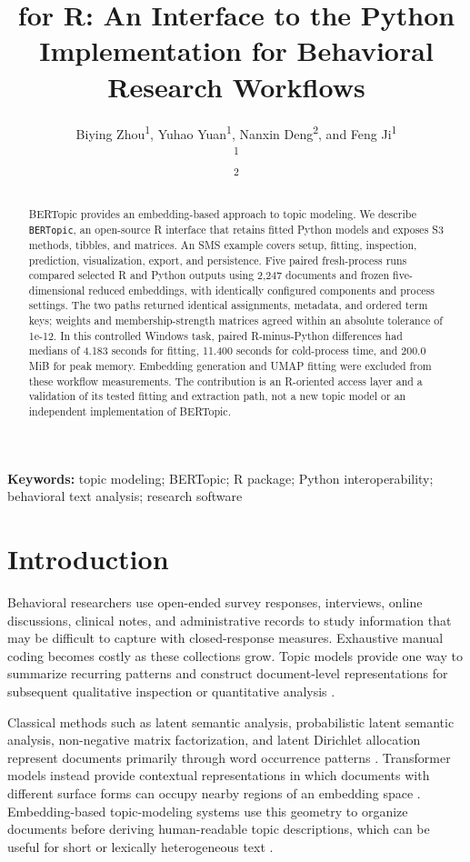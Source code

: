 \documentclass[12pt]{article}
\title{\pkg{BERTopic} for R: An Interface to the Python Implementation for Behavioral Research Workflows}
\author{
Biying Zhou\textsuperscript{1},
Yuhao Yuan\textsuperscript{1},
Nanxin Deng\textsuperscript{2},
and Feng Ji\textsuperscript{1}\\[0.5em]
\textsuperscript{1}\todo{Affiliation}\\
\textsuperscript{2}\todo{Affiliation}\\[0.5em]
\parbox{0.82\textwidth}{\centering
\todo{Corresponding author name, postal address, telephone number, and email}}
}
\date{}
\newcommand{\pkg}[1]{\texttt{#1}}
\begin{document}
\maketitle
\thispagestyle{fancy}

\begin{abstract}
BERTopic provides an embedding-based approach to topic modeling. We describe \pkg{BERTopic}, an open-source R interface that retains fitted Python models and exposes S3 methods, tibbles, and matrices. An SMS example covers setup, fitting, inspection, prediction, visualization, export, and persistence. Five paired fresh-process runs compared selected R and Python outputs using 2,247 documents and frozen five-dimensional reduced embeddings, with identically configured components and process settings. The two paths returned identical assignments, metadata, and ordered term keys; weights and membership-strength matrices agreed within an absolute tolerance of 1e-12. In this controlled Windows task, paired R-minus-Python differences had medians of 4.183 seconds for fitting, 11.400 seconds for cold-process time, and 200.0 MiB for peak memory. Embedding generation and UMAP fitting were excluded from these workflow measurements. The contribution is an R-oriented access layer and a validation of its tested fitting and extraction path, not a new topic model or an independent implementation of BERTopic.
\end{abstract}

\noindent\textbf{Keywords:} topic modeling; BERTopic; R package; Python interoperability; behavioral text analysis; research software

\section{Introduction}

Behavioral researchers use open-ended survey responses, interviews, online discussions, clinical notes, and administrative records to study information that may be difficult to capture with closed-response measures. Exhaustive manual coding becomes costly as these collections grow. Topic models provide one way to summarize recurring patterns and construct document-level representations for subsequent qualitative inspection or quantitative analysis \citep{blei2003latent,grimmer2013text,roberts2014structural}.

Classical methods such as latent semantic analysis, probabilistic latent semantic analysis, non-negative matrix factorization, and latent Dirichlet allocation represent documents primarily through word occurrence patterns \citep{deerwester1990latent,hofmann1999plsa,lee1999nmf,blei2003latent}. Transformer models instead provide contextual representations in which documents with different surface forms can occupy nearby regions of an embedding space \citep{vaswani2017attention,devlin2019bert,reimers2019sentence}. Embedding-based topic-modeling systems use this geometry to organize documents before deriving human-readable topic descriptions, which can be useful for short or lexically heterogeneous text \citep{angelov2020top2vec,bianchi2021pretraining}.
\end{document}
